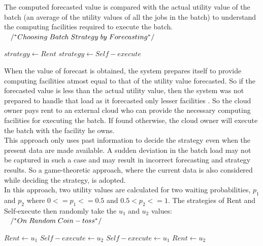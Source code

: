 \documentclass[conference]{IEEEtran}
\begin{document}
\vspace{0.2cm}
The computed forecasted value is compared with the actual utility value of the batch (an average of the utility values of all the jobs in the batch) to understand the computing facilities required to execute the batch.\\[0.3cm]
$\hspace*{3mm}/^\ast Choosing\hspace*{1mm}Batch\hspace*{1mm}Strategy\hspace*{1mm}by\hspace*{1mm}Forecasting^\ast/$\\ 
\begin{algorithmic}
	\STATE $strategy \gets Rent$
\ELSE
	\STATE $strategy \gets Self-execute$
\ENDIF
\end{algorithmic}
\vspace{0.2cm}
When the value of forecast is obtained, the system prepares itself to provide computing facilities atmost equal to that of the utility value forecasted. So if the forecasted value is less than the actual utility value, then the system was not prepared to handle that load as it forecasted only lesser facilities . So the cloud owner pays rent to an external cloud who can provide the necessary computing facilities for executing the batch. If found otherwise, the cloud owner will execute the batch with the facility he owns.\\[0.2cm]
This approach only uses past information to decide the strategy even when the present data are made available. A sudden deviation in the batch load may not be captured in such a case and may result in incorrect forecasting and strategy results. So a game-theoretic approach, where the current data is also considered while deciding the strategy, is adopted.\\[0.2cm]
In this approach, two utility values are calculated for two waiting probabilities, $p_1$ and $p_2$ where $0<=p_1<=0.5$ and $0.5<p_2<=1$. The strategies of Rent and Self-execute then randomly take the $u_1$ and $u_2$ values:\\[0.3cm]
$\hspace*{3mm}/^\ast On\hspace*{1mm}Random\hspace*{1mm}Coin-toss^\ast/$\\
\begin{algorithmic}
	\STATE $Rent \gets u_1$
	\STATE $Self-execute \gets u_2$
\ELSE
	\STATE $Self-execute \gets u_1$
	\STATE $Rent \gets u_2$
\ENDIF
\end{algorithmic}
\end{document}

